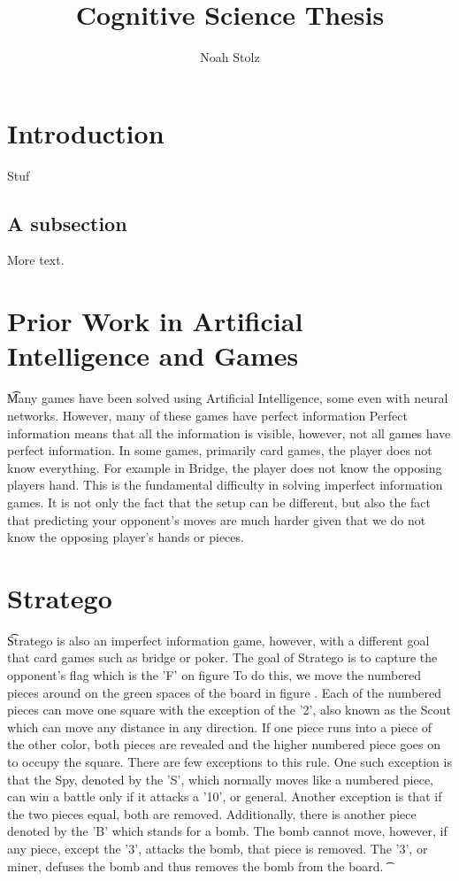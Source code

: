 \documentclass[12pt]{article} %
\title{Cognitive Science Thesis}
\author[1]{Noah Stolz}
\affil[1]{Rensselaer Polytechnic Institute}
\date{}
\begin{document}
\maketitle

\section{Introduction}

Stuf

\subsection{A subsection}

More text.
\section{Prior Work in Artificial Intelligence and Games}
\t Many games have been solved using Artificial Intelligence, some even with neural networks. %
However, many of these games have perfect information %
Perfect information means that all the information is visible, however, not all games have perfect information. In some games, primarily card games, the player does not know everything. For example in Bridge, the player does not know the opposing players hand. This is the fundamental difficulty in solving imperfect information games. It is not only the fact that the setup can be different, but also the fact that predicting your opponent's moves are much harder given that we do not know the opposing player's hands or pieces. 
\section{Stratego}
\t Stratego is also an imperfect information game, however, with a different goal that card games such as bridge or poker. The goal of Stratego is to capture the opponent's flag which is the 'F' on figure %
To do this, we move the numbered pieces around on the green spaces of the board in figure %
. Each of the numbered pieces can move one square with the exception of the '2', also known as the Scout which can move any distance in any direction. If one piece runs into a piece of the other color, both pieces are revealed and the higher numbered piece goes on to occupy the square. There are few exceptions to this rule. One such exception is that the Spy, denoted by the 'S', which normally moves like a numbered piece, can win a battle only if it attacks a '10', or general. Another exception is that if the two pieces equal, both are removed. Additionally, there is another piece denoted by the 'B' which stands for a bomb. The bomb cannot move, however, if any piece, except the '3', attacks the bomb, that piece is removed. The '3', or miner, defuses the bomb and thus removes the bomb from the board. 
\t 
\end{document}
